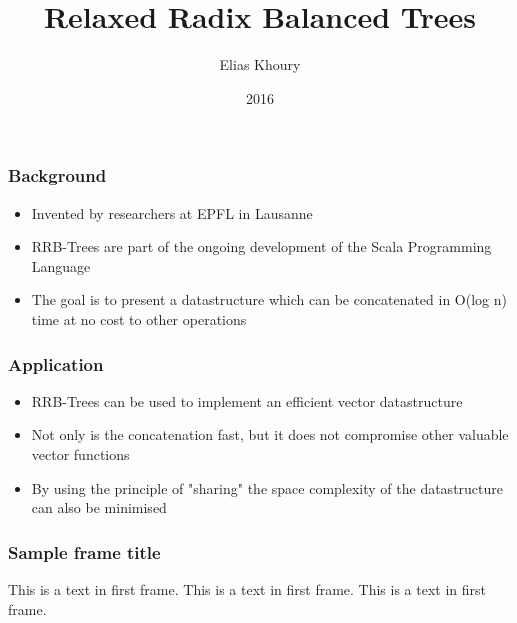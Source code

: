 \documentclass{beamer}
\title{Relaxed Radix Balanced Trees}
\author{Elias Khoury}
\date{2016}
\begin{document}
 
\frame{\titlepage}
 
\begin{frame}
\frametitle{Background}

\begin{itemize}

	\item Invented by researchers at EPFL in Lausanne
	\item RRB-Trees are part of the ongoing development of the Scala Programming Language
	\item The goal is to present a datastructure which can be concatenated in O(log n) time at no cost to other operations

\end{itemize}

\end{frame}
 
\begin{frame}

\frametitle{Application}

\begin{itemize}

	\item RRB-Trees can be used to implement an efficient vector datastructure
	\item Not only is the concatenation fast, but it does not compromise other valuable vector functions
	\item By using the principle of "sharing" the space complexity of the datastructure can also be minimised

\end{itemize}

\end{frame}
 
\begin{frame}
\frametitle{Sample frame title}
This is a text in first frame. This is a text in first frame. This is a text in first frame.
\end{frame}
 
\end{document}
